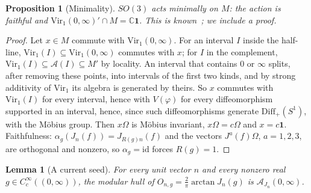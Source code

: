 \documentclass[12pt]{article}
\newtheorem{proposition}[theorem]{Proposition}
\newtheorem{lemma}[theorem]{Lemma}
\theoremstyle{definition}
\theoremstyle{remark}
\newcommand{\Vir}{\mathrm{Vir}}
\begin{document}
\begin{proposition}[Minimality]\label{prop:minimal}
\(SO(3)\) acts minimally on \(M\): the action is faithful and \(\Vir_1(0,\infty)'\cap M=\mathbb C\mathbf 1\). This is known~\cite{Carpi1999,Xu}; we include a proof.
\end{proposition}

\begin{proof}
Let \(x\in M\) commute with \(\Vir_1(0,\infty)\). For an interval \(I\) inside the
half-line, \(\Vir_1(I)\subseteq\Vir_1(0,\infty)\) commutes with \(x\); for \(I\) in the
complement, \(\Vir_1(I)\subseteq\mathcal A(I)\subseteq M'\) by locality. An interval
that contains \(0\) or \(\infty\) splits, after removing these points, into intervals of
the first two kinds, and by strong additivity of \(\Vir_1\) its algebra is generated by
theirs. So \(x\) commutes with \(\Vir_1(I)\) for every interval, hence with
\(V(\varphi)\) for every diffeomorphism supported in an interval, hence, since such
diffeomorphisms generate \(\mathrm{Diff}_+(S^1)\), with the M\"obius group. Then
\(x\Omega\) is M\"obius invariant, \(x\Omega=c\Omega\) and \(x=c\mathbf 1\). Faithfulness: \(\alpha_g(J_n(f))=J_{R(g)n}(f)\) and the vectors \(J^a(f)\Omega\), \(a=1,2,3\), are orthogonal and nonzero, so \(\alpha_g=\mathrm{id}\) forces \(R(g)=1\).
\end{proof}

\begin{lemma}[A current seed]\label{lem:current}
For every unit vector \(n\) and every nonzero real
\(g\in C_c^\infty((0,\infty))\), the modular hull of
\(O_{n,g}=\tfrac2\pi\arctan J_n(g)\) is \(\mathcal A_{J_n}(0,\infty)\).
\end{lemma}
\end{document}

